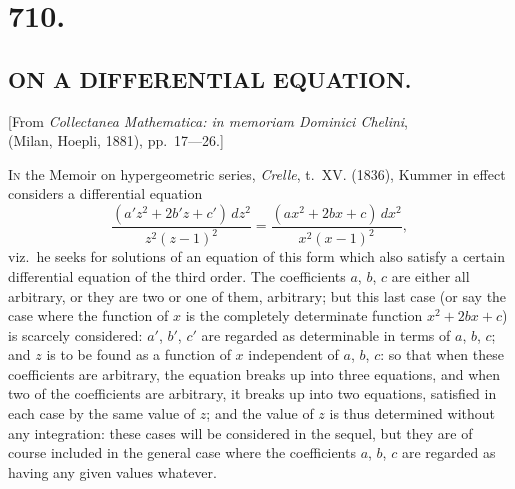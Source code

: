\documentclass[12pt,a4paper,oneside]{book}
\theoremstyle{plain}
\theoremstyle{definition}
\theoremstyle{remark}
\begin{document}
\cleardoublepage

\section*{710.}
\subsection*{ON A DIFFERENTIAL EQUATION.}

\begin{center}
[From \textit{Collectanea Mathematica: in memoriam Dominici Chelini},\\ (Milan, Hoepli, 1881), pp.~17---26.]
\end{center}
\medskip

\textsc{In} the Memoir on hypergeometric series, \textit{Crelle}, t.~XV. (1836), Kummer in effect considers a differential equation
\[
\frac{(a'z^2+2b'z+c')\,dz^2}{z^2(z-1)^2}
=\frac{(ax^2+2bx+c)\,dx^2}{x^2(x-1)^2},
\]
viz.\ he seeks for solutions of an equation of this form which also satisfy a certain differential equation of the third order. The coefficients $a$, $b$, $c$ are either all arbitrary, or they are two or one of them, arbitrary; but this last case (or say the case where the function of $x$ is the completely determinate function $x^2+2bx+c$) is scarcely considered: $a'$, $b'$, $c'$ are regarded as determinable in terms of $a$, $b$, $c$; and $z$ is to be found as a function of $x$ independent of $a$, $b$, $c$: so that when these coefficients are arbitrary, the equation breaks up into three equations, and when two of the coefficients are arbitrary, it breaks up into two equations, satisfied in each case by the same value of $z$; and the value of $z$ is thus determined without any integration: these cases will be considered in the sequel, but they are of course included in the general case where the coefficients $a$, $b$, $c$ are regarded as having any given values whatever.
\end{document}
